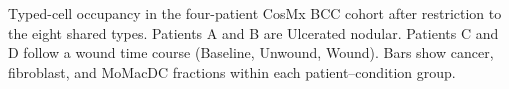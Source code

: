Typed-cell occupancy in the four-patient CosMx BCC cohort after restriction to the eight shared types. Patients A and B are Ulcerated nodular. Patients C and D follow a wound time course (Baseline, Unwound, Wound). Bars show cancer, fibroblast, and MoMacDC fractions within each patient--condition group.
